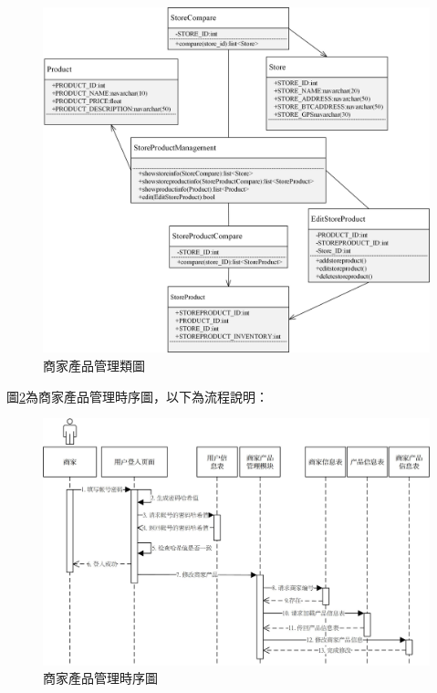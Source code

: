 	\begin{figure}[!htbp]
		\centering
		\includegraphics[width = 1\textwidth]{c2.jpg}
		\caption{商家產品管理類圖}\label{c2}
	\end{figure}

	圖\ref{time3}為商家產品管理時序圖，以下為流程說明：

	\begin{figure}[!htbp]
		\centering
		\includegraphics[width = 1\textwidth]{time3.jpg}
		\caption{商家產品管理時序圖}\label{time3}
	\end{figure}

